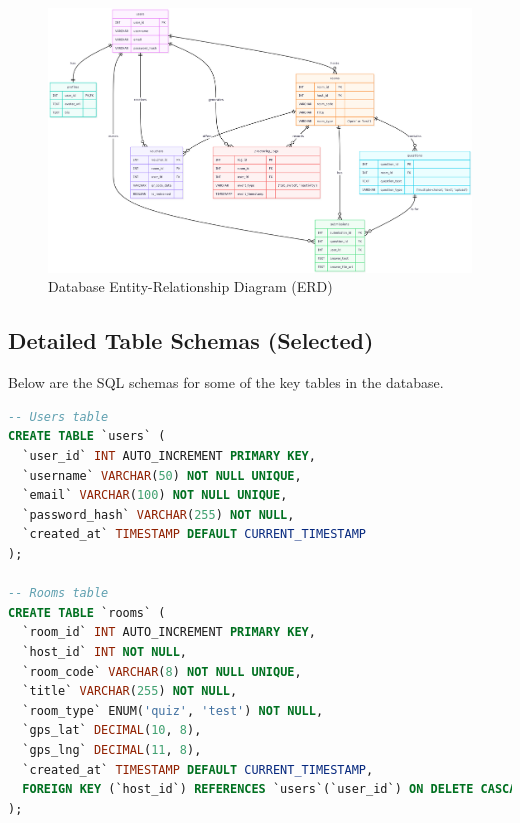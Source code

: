 \begin{figure}[htbp]
\centering
\includegraphics[width=\textwidth]{figures/erd-diagram.png}
\caption{Database Entity-Relationship Diagram (ERD)}
\label{fig:erd-diagram}
\end{figure}

\subsection{Detailed Table Schemas (Selected)}
Below are the SQL schemas for some of the key tables in the database.

\begin{lstlisting}[language=SQL, caption={SQL Schema for the `users` and `rooms` tables}]
-- Users table
CREATE TABLE `users` (
  `user_id` INT AUTO_INCREMENT PRIMARY KEY,
  `username` VARCHAR(50) NOT NULL UNIQUE,
  `email` VARCHAR(100) NOT NULL UNIQUE,
  `password_hash` VARCHAR(255) NOT NULL,
  `created_at` TIMESTAMP DEFAULT CURRENT_TIMESTAMP
);

-- Rooms table
CREATE TABLE `rooms` (
  `room_id` INT AUTO_INCREMENT PRIMARY KEY,
  `host_id` INT NOT NULL,
  `room_code` VARCHAR(8) NOT NULL UNIQUE,
  `title` VARCHAR(255) NOT NULL,
  `room_type` ENUM('quiz', 'test') NOT NULL,
  `gps_lat` DECIMAL(10, 8),
  `gps_lng` DECIMAL(11, 8),
  `created_at` TIMESTAMP DEFAULT CURRENT_TIMESTAMP,
  FOREIGN KEY (`host_id`) REFERENCES `users`(`user_id`) ON DELETE CASCADE
);
\end{lstlisting}

